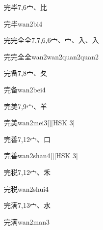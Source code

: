 \begin{entry}{完毕}{7,6}{⼧、⽐}
  \begin{phonetics}{完毕}{wan2bi4}
  \end{phonetics}
\end{entry}

\begin{entry}{完完全全}{7,7,6,6}{⼧、⼧、⼊、⼊}
  \begin{phonetics}{完完全全}{wan2wan2quan2quan2}
  \end{phonetics}
\end{entry}

\begin{entry}{完备}{7,8}{⼧、⼡}
  \begin{phonetics}{完备}{wan2bei4}
  \end{phonetics}
\end{entry}

\begin{entry}{完美}{7,9}{⼧、⽺}
  \begin{phonetics}{完美}{wan2mei3}[][HSK 3]
  \end{phonetics}
\end{entry}

\begin{entry}{完善}{7,12}{⼧、⼝}
  \begin{phonetics}{完善}{wan2shan4}[][HSK 3]
  \end{phonetics}
\end{entry}

\begin{entry}{完税}{7,12}{⼧、⽲}
  \begin{phonetics}{完税}{wan2shui4}
  \end{phonetics}
\end{entry}

\begin{entry}{完满}{7,13}{⼧、⽔}
  \begin{phonetics}{完满}{wan2man3}
  \end{phonetics}
\end{entry}

